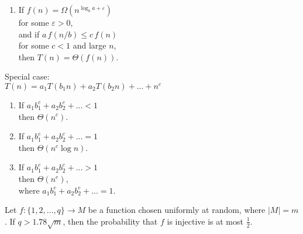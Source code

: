 \documentclass[a4paper,landscape]{article}
\begin{document}
\begin{multicols}{7}
\begin{enumerate}[noitemsep, topsep=0pt]
    \item If \( f(n) = \Omega(n^{\log_b a + \varepsilon}) \) \\ for some \( \varepsilon > 0 \),\\
          and if \( a\,f(n/b) \leq c\,f(n) \) \\ for some \( c < 1 \) and large \( n \),\\
          then \( T(n) = \Theta(f(n)) \).
\end{enumerate}
\tcblower
Special case:\\
\(T(n) = a_1T(b_1n) + a_2T(b_2n) + ... + n^c\)
\begin{enumerate}[noitemsep, topsep=0pt]
    \item If \(a_1b_1^c + a_2b_2^c + ...  < 1 \) \\ \hspace*{2mm} then \( \Theta(n^c)\).
    \item If \(a_1b_1^c + a_2b_2^c + ...  = 1\) \\ \hspace*{2mm} then \( \Theta(n^c \log n)\).
    \item If \(a_1b_1^c + a_2b_2^c + ...  > 1 \) \\ \hspace*{2mm} then \( \Theta(n^e)\), \\ \hspace*{2mm} where \(a_1b_1^e + a_2b_2^e + ... = 1\).
\end{enumerate}
\endtcolorbox

\tcolorbox[mybox={Injective Functions}] 
Let $f : \{1, 2, \dots, q\} \to M$ be a function chosen uniformly at random, where $|M| = m$.  
If $q > 1.78\sqrt{m}$, then the probability that $f$ is injective is at most $\frac{1}{2}$.
\endtcolorbox


\end{multicols}
\end{document}
